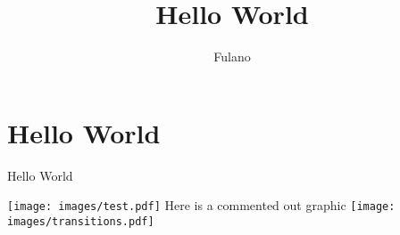 \documentclass[A4paper, 12pt]{article}
\title{Hello World}
\author{Fulano}
\begin{document}
\nocite{*}
\tableofcontents
\maketitle

\cite{asyatoms}

\section{Hello World} %
\label{sec:hello_world}







Hello World


\texttt{[image: images/test.pdf]}
\newpage
Here is a commented out graphic
\newpage
\texttt{[image: images/transitions.pdf]}



\end{document}
